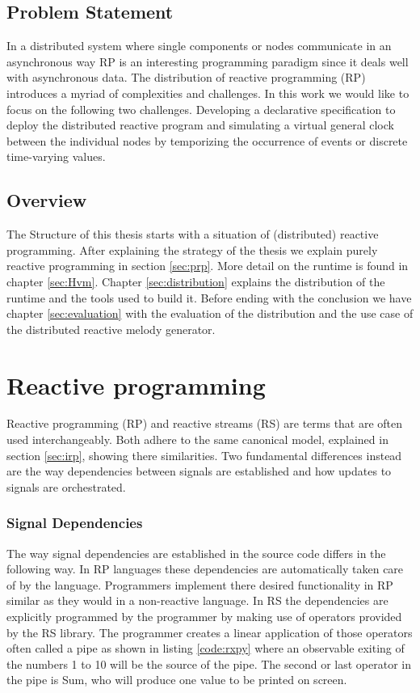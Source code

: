 \documentclass[a4paper]{book}
\begin{document}
\section{Problem Statement}
In a distributed system where single components or nodes communicate in an asynchronous way RP is an interesting programming paradigm since it deals well with asynchronous data. The distribution of reactive programming (RP) introduces a myriad of complexities and challenges. In this work we would like to focus on the following two challenges. Developing a declarative specification to deploy the distributed reactive program and simulating a virtual general clock between the individual nodes by temporizing the occurrence of events or discrete time-varying values. 

\section{Overview}
The Structure of this thesis starts with a situation of (distributed) reactive programming. After explaining the strategy of the thesis we explain purely reactive programming in section \ref{sec:prp}. More detail on the runtime is found in chapter \ref{sec:Hvm}. Chapter \ref{sec:distribution} explains the distribution of the runtime and the tools used to build it. Before ending with the conclusion we have chapter \ref{sec:evaluation} with the evaluation of the distribution and the use case of the distributed reactive melody generator. 

\chapter{Reactive programming}

Reactive programming (RP) and reactive streams (RS) are terms that are often used interchangeably. Both adhere to the same canonical model, explained in section \ref{sec:irp}, showing there similarities. Two fundamental differences instead are the way dependencies between signals are established and how updates to signals are orchestrated.

\subsection{Signal Dependencies}
The way signal dependencies are established in the source code differs in the following way. In RP languages these dependencies are automatically taken care of by the language. Programmers implement there desired functionality in RP similar as they would in a non-reactive language. In RS the dependencies are explicitly programmed by the programmer by making use of operators provided by the RS library. The programmer creates a linear application of those operators often called a pipe as shown in listing \ref{code:rxpy} where an observable exiting of the numbers 1 to 10 will be the source of the pipe. The second or last operator in the pipe is Sum, who will produce one value to be printed on screen.
\end{document}
